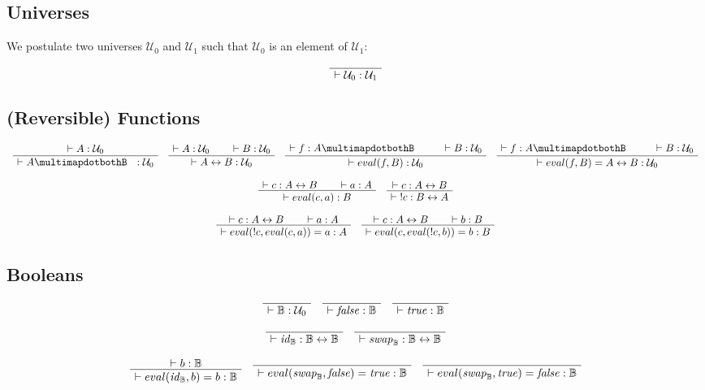 \documentclass[format=acmlarge,review,natbib]{acmart}
\newcommand{\invc}[1]{!#1}
\newcommand{\evalone}[2]{eval(#1,#2)}
\newcommand{\idc}{\mathit{id}_{\boolt}}
\newcommand{\swapc}{\mathit{swap}_{\boolt}}
\newcommand{\iso}{\leftrightarrow}
\newcommand{\piso}{\multimapdotbothB~~}
\newcommand{\fc}{\mathit{false}}
\newcommand{\tc}{\mathit{true}}
\newcommand{\boolt}{\mathbb{B}}
\newcommand{\uzero}{\mathcal{U}_0}
\newcommand{\uone}{\mathcal{U}_1}
\newcommand{\proves}{\vdash}
\newcommand{\jdg}[2]{\proves #1 : #2}
\begin{document}
\subsection{Universes}

We postulate two universes $\uzero$ and $\uone$ such that $\uzero$ is an element
of $\uone$:

\[
  \AxiomC{}
  \UnaryInfC{$\jdg{\uzero}{\uone}$}
  \DisplayProof
\]

\subsection{(Reversible) Functions}

\[
  \begin{array}{c}
    \AxiomC{$\jdg{A}{\uzero}$}
    \UnaryInfC{$\jdg{A\piso}{\uzero}$}
    \DisplayProof
    \quad
    \AxiomC{$\jdg{A}{\uzero}$}
    \AxiomC{$\jdg{B}{\uzero}$}
    \BinaryInfC{$\jdg{A\iso B}{\uzero}$}
    \DisplayProof
    \quad
    \AxiomC{$\jdg{f}{A \piso}$}
    \AxiomC{$\jdg{B}{\uzero}$}
    \BinaryInfC{$\jdg{\evalone{f}{B}}{\uzero}$}
    \DisplayProof
    \quad
    \AxiomC{$\jdg{f}{A \piso}$}
    \AxiomC{$\jdg{B}{\uzero}$}
    \BinaryInfC{$\jdg{\evalone{f}{B} = A \iso B}{\uzero}$}
    \DisplayProof
    \\
    \\
    \AxiomC{$\jdg{c}{A \iso B}$}
    \AxiomC{$\jdg{a}{A}$}
    \BinaryInfC{$\jdg{\evalone{c}{a}}{B}$}
    \DisplayProof
    \quad
    \AxiomC{$\jdg{c}{A \iso B}$}
    \UnaryInfC{$\jdg{\;\invc{c}}{B \iso A}$}
    \DisplayProof
    \\
    \\
    \AxiomC{$\jdg{c}{A \iso B}$}
    \AxiomC{$\jdg{a}{A}$}
    \BinaryInfC{$\jdg{\evalone{\invc{c}}{\evalone{c}{a}} = a}{A}$}
    \DisplayProof
    \quad
    \AxiomC{$\jdg{c}{A \iso B}$}
    \AxiomC{$\jdg{b}{B}$}
    \BinaryInfC{$\jdg{\evalone{c}{\evalone{\invc{c}}{b}} = b}{B}$}
    \DisplayProof
  \end{array}
\]

\subsection{Booleans}

\[
  \begin{array}{c}
    \AxiomC{}
    \UnaryInfC{$\jdg{\boolt}{\uzero}$}
    \DisplayProof
    \quad
    \AxiomC{}
    \UnaryInfC{$\jdg{\fc}{\boolt}$}
    \DisplayProof
    \quad
    \AxiomC{}
    \UnaryInfC{$\jdg{\tc}{\boolt}$}
    \DisplayProof
    \\
    \\
    \AxiomC{}
    \UnaryInfC{$\jdg{\idc}{\boolt\iso\boolt}$}
    \DisplayProof
    \quad
    \AxiomC{}
    \UnaryInfC{$\jdg{\swapc}{\boolt\iso\boolt}$}
    \DisplayProof
    \\
    \\
    \AxiomC{$\jdg{b}{\boolt}$}
    \UnaryInfC{$\jdg{\evalone{\idc}{b} = b}{\boolt}$}
    \DisplayProof
    \quad
    \AxiomC{}
    \UnaryInfC{$\jdg{\evalone{\swapc}{\fc} = \tc}{\boolt}$}
    \DisplayProof
    \quad
    \AxiomC{}
    \UnaryInfC{$\jdg{\evalone{\swapc}{\tc} = \fc}{\boolt}$}
    \DisplayProof
  \end{array}
\]
\end{document}
